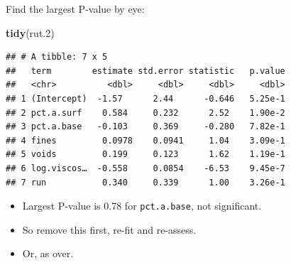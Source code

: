 \documentclass[
  ignorenonframetext,
]{beamer}
\newenvironment{Shaded}{\begin{snugshade}}{\end{snugshade}}
\newcommand{\FloatTok}[1]{\textcolor[rgb]{0.00,0.00,0.81}{#1}}
\newcommand{\KeywordTok}[1]{\textcolor[rgb]{0.13,0.29,0.53}{\textbf{#1}}}
\newcommand{\NormalTok}[1]{#1}
\providecommand{\tightlist}{%
  \setlength{\itemsep}{0pt}\setlength{\parskip}{0pt}}
\begin{document}
\begin{frame}[fragile]{Find the largest P-value by eye:}
\protect\hypertarget{find-the-largest-p-value-by-eye}{}

\begin{Shaded}
\begin{Highlighting}[]
\KeywordTok{tidy}\NormalTok{(rut}\FloatTok{.2}\NormalTok{)}
\end{Highlighting}
\end{Shaded}

\begin{verbatim}
## # A tibble: 7 x 5
##   term        estimate std.error statistic   p.value
##   <chr>          <dbl>     <dbl>     <dbl>     <dbl>
## 1 (Intercept)  -1.57      2.44      -0.646   5.25e-1
## 2 pct.a.surf    0.584     0.232      2.52    1.90e-2
## 3 pct.a.base   -0.103     0.369     -0.280   7.82e-1
## 4 fines         0.0978    0.0941     1.04    3.09e-1
## 5 voids         0.199     0.123      1.62    1.19e-1
## 6 log.viscos…  -0.558     0.0854    -6.53    9.45e-7
## 7 run           0.340     0.339      1.00    3.26e-1
\end{verbatim}

\begin{itemize}
\tightlist
\item
  Largest P-value is 0.78 for \texttt{pct.a.base}, not significant.
\item
  So remove this first, re-fit and re-assess.
\item
  Or, as over.
\end{itemize}

\end{frame}
\end{document}

